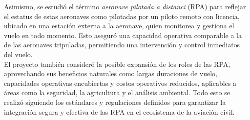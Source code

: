 Asimismo, se estudió el término \textit{aeronave pilotada a distanci} (RPA) para reflejar el estatus de estas aeronaves como pilotadas por un piloto remoto con licencia, ubicado en una estación externa a la aeronave, quien monitorea y gestiona el vuelo en todo momento. Esto aseguró una capacidad operativa comparable a la de las aeronaves tripuladas, permitiendo una intervención y control inmediatos del vuelo.\\

El proyecto también consideró la posible expansión de los roles de las RPA, aprovechando sus beneficios naturales como largas duraciones de vuelo, capacidades operativas encubiertas y costos operativos reducidos, aplicables a áreas como la seguridad, la agricultura y el análisis ambiental. Todo esto se realizó siguiendo los estándares y regulaciones definidos para garantizar la integración segura y efectiva de las RPA en el ecosistema de la aviación civil.

